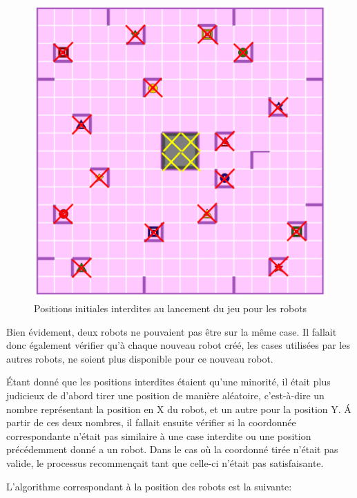 \documentclass[a4paper, 12pt]{article}
\begin{document}
        \begin{figure}[H]
            \centering
            \includegraphics[scale=0.17]{images/positionInterdite.png}
            \caption{Positions initiales interdites au lancement du jeu pour les robots}
        \end{figure}
        
        Bien évidement, deux robots ne pouvaient pas être sur la même case. Il fallait donc également vérifier qu'à chaque nouveau robot créé, les cases utilisées par les autres robots, ne soient plus disponible pour ce nouveau robot.
        
        Étant donné que les positions interdites étaient qu'une minorité, il était plus judicieux de d'abord tirer une position de manière aléatoire, c'est-à-dire un nombre représentant la position en X du robot, et un autre pour la position Y. Á partir de ces deux nombres, il fallait ensuite vérifier si la coordonnée correspondante n'était pas similaire à une case interdite ou une position précédemment donné a un robot. Dans le cas où la coordonné tirée n'était pas valide, le processus recommençait tant que celle-ci n'était pas satisfaisante. 
        
        L'algorithme correspondant à la position des robots est la suivante:
        
\end{document}
